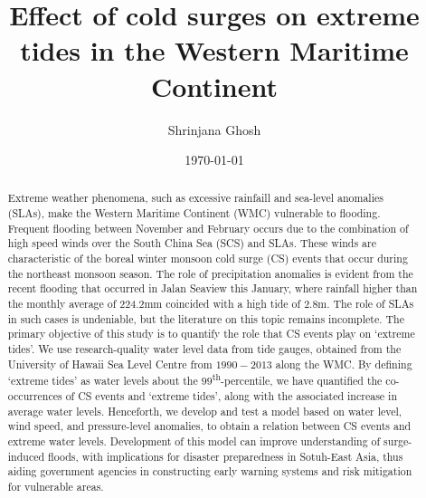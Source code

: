 \documentclass[12pt]{article}
\begin{document}
\title{\vspace{-2.0cm}Effect of cold surges on extreme tides in the Western Maritime Continent}
\author{Shrinjana Ghosh}
\date{\today}
\vfill





\maketitle

\begin{abstract}
    Extreme weather phenomena, such as excessive rainfaill and sea-level anomalies (SLAs), 
    make the Western Maritime Continent (WMC) vulnerable to flooding. Frequent flooding between
    November and February occurs due to the combination of high speed winds over
    the South China Sea (SCS) and SLAs. These winds are characteristic of the boreal winter monsoon
    cold surge (CS) events that occur during the northeast monsoon season. The role of precipitation 
    anomalies is evident from the recent flooding that occurred in Jalan Seaview this January, where
    rainfall higher than the monthly average of 224.2mm coincided with a high tide of 2.8m. The role of
    SLAs in such cases is undeniable, but the literature on this topic remains incomplete. The primary 
    objective of this study is to quantify the role that CS events play on `extreme tides'. We use research-quality
    water level data from tide gauges, obtained from the University of Hawaii Sea Level Centre from $1990-2013$ along
    the WMC. By defining `extreme tides' as water levels about the $99$\textsuperscript{th}-percentile, we have quantified
    the co-occurrences of CS events and `extreme tides', along with the associated increase in average water levels. Henceforth,
    we develop and test a model based on water level, wind speed, and pressure-level anomalies, to obtain a relation between CS events
    and extreme water levels. Development of this model can improve understanding of surge-induced floods, with 
    implications for disaster preparedness in Sotuh-East Asia, thus aiding government agencies in constructing 
    early warning systems and risk mitigation for vulnerable areas.
\end{abstract}
\end{document}

